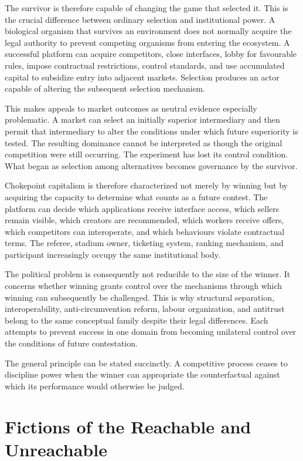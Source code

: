 \documentclass[11pt]{article}
\begin{document}
The survivor is therefore capable of changing the game that selected it. This is the crucial difference between ordinary selection and institutional power. A biological organism that survives an environment does not normally acquire the legal authority to prevent competing organisms from entering the ecosystem. A successful platform can acquire competitors, close interfaces, lobby for favourable rules, impose contractual restrictions, control standards, and use accumulated capital to subsidize entry into adjacent markets. Selection produces an actor capable of altering the subsequent selection mechanism.

This makes appeals to market outcomes as neutral evidence especially problematic. A market can select an initially superior intermediary and then permit that intermediary to alter the conditions under which future superiority is tested. The resulting dominance cannot be interpreted as though the original competition were still occurring. The experiment has lost its control condition. What began as selection among alternatives becomes governance by the survivor.

Chokepoint capitalism is therefore characterized not merely by winning but by acquiring the capacity to determine what counts as a future contest. The platform can decide which applications receive interface access, which sellers remain visible, which creators are recommended, which workers receive offers, which competitors can interoperate, and which behaviours violate contractual terms. The referee, stadium owner, ticketing system, ranking mechanism, and participant increasingly occupy the same institutional body.

The political problem is consequently not reducible to the size of the winner. It concerns whether winning grants control over the mechanisms through which winning can subsequently be challenged. This is why structural separation, interoperability, anti-circumvention reform, labour organization, and antitrust belong to the same conceptual family despite their legal differences. Each attempts to prevent success in one domain from becoming unilateral control over the conditions of future contestation.

The general principle can be stated succinctly. A competitive process ceases to discipline power when the winner can appropriate the counterfactual against which its performance would otherwise be judged.

\section{Fictions of the Reachable and Unreachable}
\end{document}
